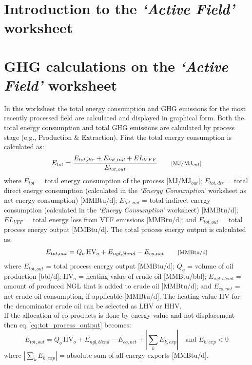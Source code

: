 \documentclass[11pt]{report}
\newcommand{\marg}[1]{{\footnotesize\textit{\textcolor{stanford}{'#1'}}}}
\newcommand{\marginnote}[1]{\marginpar{\marg{#1}}}
\newcommand{\sheet}[1]{\textit{`{#1}'}}
\begin{document}
\clearpage

\section{Introduction to the \sheet{Active Field} worksheet}



\clearpage

\section{GHG calculations on the \sheet{Active Field} worksheet}
In this worksheet the total energy consumption and GHG emissions for the most recently processed field are calculated and displayed in graphical form. Both the total energy consumption and total GHG emissions are calculated by process stage (e.g., Production \& Extraction). First the total energy consumption is calculated as: \marginnote{Active Field 3.1.1. - 3.7.1, Table 1}
\begin{equation} 
E_{tot} = \frac{E_{tot,dir} + E_{tot,ind} + EL_{VFF}}{E_{tot,out}} \quad\quad\footnotesize{\text{[MJ/MJ$_{out}$]}}
\end{equation}
where $E_{tot}$ = total energy consumption of the process [MJ/MJ$_{out}$]; $E_{tot,dir}$ = total direct energy consumption (calculated in the \sheet{Energy Consumption} worksheet as net energy consumption) [MMBtu/d]; $E_{tot,ind}$ = total indirect energy consumption (calculated in the \sheet{Energy Consumption} worksheet) [MMBtu/d]; $EL_{VFF}$ = total energy loss from VFF emissions [MMBtu/d]; and $E_{tot,out}$ = total process energy output [MMBtu/d]. The total process energy output is calculated as: \marginnote{Active Field 5.1.1. - 5.9.1}
\begin{equation}\label{eq:tot_process_output}
E_{tot,out} = Q_{o}\,\text{HV}_{o} + E_{ngl,blend} - E_{co,net} \quad\quad\footnotesize{\text{[MMBtu/d]}}
\end{equation}
where $E_{tot,out}$ = total process energy output [MMBtu/d]; $Q_{o}$ = volume of oil production [bbl/d]; HV$_{o}$ = heating value of crude oil [MMBtu/bbl]; \newline $E_{ngl,blend}$ = amount of produced NGL that is added to crude oil [MMBtu/d]; and $E_{co,net}$ = net crude oil consumption, if applicable [MMBtu/d]. The heating value HV for the denominator crude oil can be selected as LHV or HHV. \marginnote{Fuel Specs 1.1}\\
If the allocation of co-products is done by energy value and not displacement then eq.\,\eqref{eq:tot_process_output} becomes:
\begin{equation} 
E_{tot,out} = Q_{o}\,\text{HV}_{o} + E_{ngl,blend} - E_{co,net} + |\sum_k E_{k,exp}| \quad\text{and}\,\, E_{k,exp}< 0 
\end{equation}
where $|\sum_k E_{k,exp}|$ = absolute sum of all energy exports [MMBtu/d].
\end{document}
